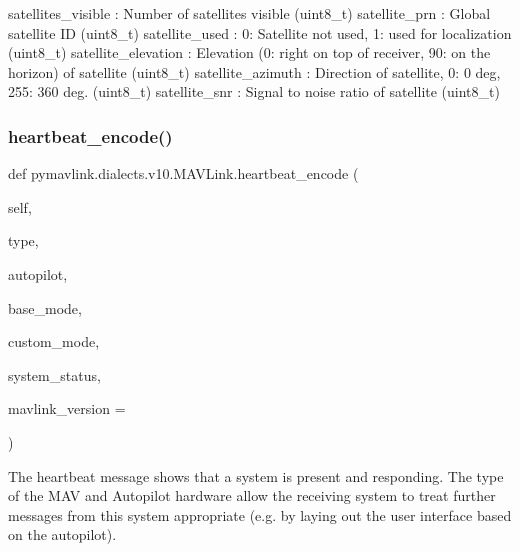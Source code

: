\begin{DoxyVerb}
\begin{DoxyVerb}
\begin{DoxyVerb}
satellites_visible        : Number of satellites visible (uint8_t)
satellite_prn             : Global satellite ID (uint8_t)
satellite_used            : 0: Satellite not used, 1: used for localization (uint8_t)
satellite_elevation        : Elevation (0: right on top of receiver, 90: on the horizon) of satellite (uint8_t)
satellite_azimuth         : Direction of satellite, 0: 0 deg, 255: 360 deg. (uint8_t)
satellite_snr             : Signal to noise ratio of satellite (uint8_t)\end{DoxyVerb}
 \mbox{\label{classpymavlink_1_1dialects_1_1v10_1_1MAVLink_a021a8636c75c709fdddb5af02d44456d}} 
\subsubsection{\texorpdfstring{heartbeat\+\_\+encode()}{heartbeat\_encode()}}
{\footnotesize\ttfamily def pymavlink.\+dialects.\+v10.\+M\+A\+V\+Link.\+heartbeat\+\_\+encode (\begin{DoxyParamCaption}\item[{}]{self,  }\item[{}]{type,  }\item[{}]{autopilot,  }\item[{}]{base\+\_\+mode,  }\item[{}]{custom\+\_\+mode,  }\item[{}]{system\+\_\+status,  }\item[{}]{mavlink\+\_\+version = {} }\end{DoxyParamCaption})}

\begin{DoxyVerb}The heartbeat message shows that a system is present and responding.
The type of the MAV and Autopilot hardware allow the
receiving system to treat further messages from this
system appropriate (e.g. by laying out the user
interface based on the autopilot).


\end{DoxyVerb}
\end{DoxyVerb}
\end{DoxyVerb}
